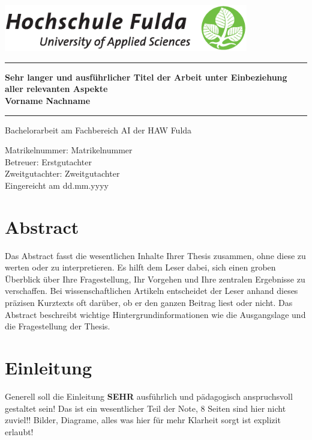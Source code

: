 \documentclass[12pt,oneside]{article}
\newcommand{\HSFTitle}[8]{

  \thispagestyle{empty}
\begin{center}
    \includegraphics[width=0.8\textwidth]{logo.eps} \\
    \vspace*{\stretch{1}}
    \end{center}

  {\parindent0cm
  \rule{\linewidth}{.7ex}}
  \begin{center}
    \vspace*{\stretch{1}}
    \sffamily\bfseries\Huge
    #1\\
    \vspace*{\stretch{1}}
    \sffamily\bfseries\large
    #3
    \vspace*{\stretch{1}}
  \end{center}
  \rule{\linewidth}{.7ex}

  \vspace*{\stretch{2}}
  \begin{center}
    \Large #2 am #5 der HAW Fulda \\
    \vspace*{\stretch{1}}

    \large Matrikelnummer:  #4 \\[1mm]
    \large Betreuer:  #7 \\[1mm]
    \large Zweitgutachter:  #8 \\[1mm]

    \vspace*{\stretch{1}}
    \large Eingereicht am #6
  \end{center}
}
\begin{document}
\makeatletter
  \HSFTitle
      {Sehr langer und ausführlicher Titel der Arbeit unter Einbeziehung aller relevanten Aspekte }        %
      {Bachelorarbeit} %
      {Vorname Nachname}          %
      {Matrikelnummer}
      {Fachbereich AI}  %
      {dd.mm.yyyy}        %
      {Erstgutachter}     %
      {Zweitgutachter}    %
  \clearpage

\lhead{}
    \setcounter{page}{1}

\clearpage
%
\section*{Abstract}

Das Abstract fasst die wesentlichen Inhalte Ihrer Thesis zusammen,
ohne diese zu werten oder zu interpretieren. Es hilft dem Leser dabei, sich einen groben Überblick
über Ihre Fragestellung, Ihr Vorgehen und Ihre zentralen Ergebnisse zu verschaffen. Bei
wissenschaftlichen Artikeln entscheidet der Leser anhand dieses präzisen Kurztexts oft darüber, ob er
den ganzen Beitrag liest oder nicht. Das Abstract beschreibt wichtige Hintergrundinformationen wie die Ausgangslage und die Fragestellung der Thesis.


\clearpage
\tableofcontents
\clearpage

\listoffigures

\listoftables
\clearpage


\cleardoublepage
{}
    \setcounter{page}{1}
\lhead{\nouppercase{\leftmark}}


\section{Einleitung} \label{sec:einleitung}
Generell soll die Einleitung \textbf{SEHR} ausführlich und pädagogisch anspruchsvoll gestaltet sein! Das ist ein wesentlicher Teil der Note, 8 Seiten sind hier nicht zuviel!!
Bilder, Diagrame, alles was hier für mehr Klarheit sorgt ist explizit erlaubt!
%
\end{document}
